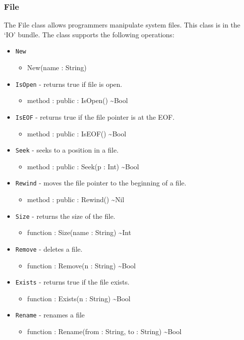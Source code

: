 \documentclass[12pt]{article}
\begin{document}
\subsubsection{File}
The File class allows programmers manipulate system files.  This class
is in the `IO' bundle.  The class supports the following operations:
\begin{itemize}
\item \texttt{New}
  \begin{itemize}
  \item New(name : String)
  \end{itemize}
\item \texttt{IsOpen} - returns true if file is open.
  \begin{itemize}
  \item method : public : IsOpen() \textasciitilde Bool
  \end{itemize}
\item \texttt{IsEOF} - returns true if the file pointer is at the EOF.
  \begin{itemize}
  \item method : public : IsEOF() \textasciitilde Bool
  \end{itemize}
\item \texttt{Seek} - seeks to a position in a file.
  \begin{itemize}
  \item method : public : Seek(p : Int) \textasciitilde Bool
  \end{itemize}
\item \texttt{Rewind} - moves the file pointer to the beginning of a
  file.
  \begin{itemize}
  \item method : public : Rewind() \textasciitilde Nil
  \end{itemize}
\item \texttt{Size} - returns the size of the file.
  \begin{itemize}
  \item function : Size(name : String) \textasciitilde Int
  \end{itemize}
\item \texttt{Remove} - deletes a file.
  \begin{itemize}
  \item function : Remove(n : String) \textasciitilde Bool
  \end{itemize}
\item \texttt{Exists} - returns true if the file exists.
  \begin{itemize}
  \item function : Exists(n : String) \textasciitilde Bool
  \end{itemize}
\item \texttt{Rename} - renames a file
  \begin{itemize}
  \item function : Rename(from : String, to : String) \textasciitilde Bool
  \end{itemize}
\end{itemize}
\end{document}
